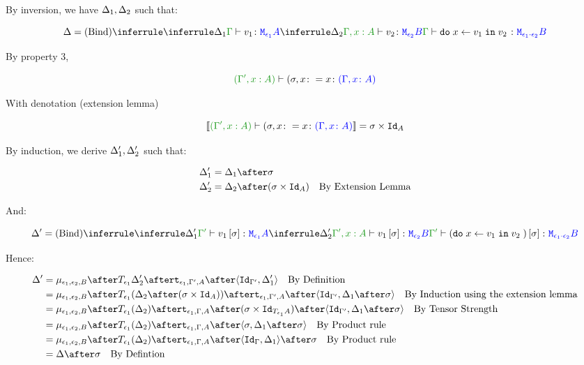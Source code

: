 \documentclass{report}
\begin{document}

By inversion, we have $\Delta_1, \Delta_2$ such that:

\begin{equation}
    \D = \ntreeruleII{Bind}{
        \treeruleI{\D_1}{\typerelation{\G}{v_1}{\M{\e_1}{A}}}
        }{
        \treeruleI{\D_2}{\typerelation{\G, x:A }{v_2}{\M{\e_2}{B}}}
    }{
        \typerelation{\G}{\doin{x}{v_1}{v_2}}{\M{\e_1\dot\e_2}{B}}
    }
\end{equation}

By property 3,

\begin{equation}
    \typerelation{(\G', x:A)}{(\si, x\setto x}{(\gax)}
\end{equation}

With denotation (extension lemma)

\begin{equation}
    \deno{\typerelation{(\G', x:A)}{(\si, x\setto x}{(\gax)}} = \si\times\Id{A}
\end{equation}

By induction, we derive $\Delta_1', \Delta_2'$ such that:

\begin{align*}
    \D_1' & = \D_1\after \si\\
    \D_2' & = \D_2\after (\si\times\Id{A})\qt{By Extension Lemma}
\end{align*}

And:

\begin{equation}
    \D' = \ntreeruleII{Bind}{
        \treeruleI{\D_1'}{\typerelation{\G'}{v_1\ssi}{\M{\e_1}{A}}}
        }{
        \treeruleI{\D_2'}{\typerelation{\G', x:A }{v_1\ssi}{\M{\e_2}{B}}}
    }{
        \typerelation{\G'}{(\doin{x}{v_1}{v_2})\ssi}{\M{\e_1\dot\e_2}{B}}
    }
\end{equation}

Hence:

\begin{align*}
    \D' & = \bind{\e_1}{\e_2}{B}\after\T{\e_1}{\D_2'}\after\tstrength{\e_1}{\G'}{A}\after\pr{\Id{\G'}}{\D_1'}\qt{By Definition}\\
    & = \bind{\e_1}{\e_2}{B}\after\T{\e_1}{(\D_2\after(\si\times\Id{A}))}\after\tstrength{\e_1}{\G'}{A}\after\pr{\Id{\G'}}{\D_1\after\si}\qt{By Induction using the extension lemma}\\
    & = \bind{\e_1}{\e_2}{B}\after\T{\e_1}{(\D_2)}\after\tstrength{\e_1}{\G}{A}\after(\si\times\Id{\T{\e_1}{A}})\after\pr{\Id{\G'}}{\D_1\after\si}\qt{By Tensor Strength}\\
    & = \bind{\e_1}{\e_2}{B}\after\T{\e_1}{(\D_2)}\after\tstrength{\e_1}{\G}{A}\after\pr{\si}{\D_1\after\si}\qt{By Product rule}\\
    & = \bind{\e_1}{\e_2}{B}\after\T{\e_1}{(\D_2)}\after\tstrength{\e_1}{\G}{A}\after\pr{\idg}{\D_1}\after\si\qt{By Product rule}\\
    &= \D\after\si\qt{By Defintion}\\
\end{align*}
\end{document}
